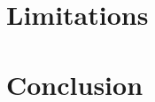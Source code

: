 \documentclass[review]{elsarticle}
\begin{document}


    \section{Limitations}



    \section{Conclusion} %


    
    
\end{document}
